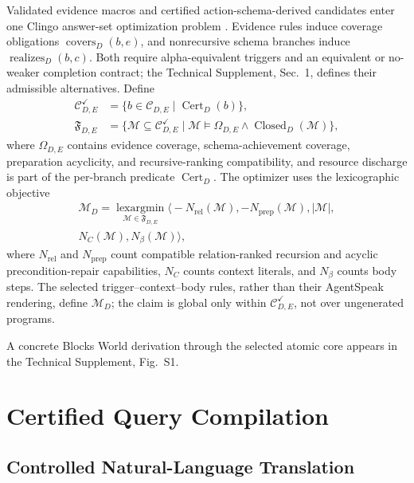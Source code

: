Validated evidence macros and certified action-schema-derived candidates enter
one Clingo answer-set optimization problem
\cite{Gebser2018Clingo}. Evidence rules induce coverage obligations
$\operatorname{covers}_D(b,e)$, and nonrecursive schema branches induce
$\operatorname{realizes}_D(b,c)$. Both require alpha-equivalent triggers and an
equivalent or no-weaker completion contract; the Technical Supplement, Sec.~1,
defines their admissible alternatives.
Define
\begin{align*}
\mathcal C^{\checkmark}_{D,E}
  &=\{b\in\mathcal C_{D,E}\mid\operatorname{Cert}_D(b)\},\\
\mathfrak F_{D,E}
  &=\{\mathcal M\subseteq\mathcal C^{\checkmark}_{D,E}\mid
      \mathcal M\models\Omega_{D,E}\land
      \operatorname{Closed}_D(\mathcal M)\},
\end{align*}
where $\Omega_{D,E}$ contains evidence coverage, schema-achievement coverage,
preparation acyclicity, and recursive-ranking compatibility, and resource
discharge is part of the per-branch predicate $\operatorname{Cert}_D$.
The optimizer uses the
lexicographic objective
\begin{multline*}
\mathcal M_D=\operatorname*{lexargmin}_{\mathcal M\in\mathfrak F_{D,E}}
\bigl\langle-N_{\mathrm{rel}}(\mathcal M),-N_{\mathrm{prep}}(\mathcal M),
|\mathcal M|,\\
N_C(\mathcal M),N_\beta(\mathcal M)\bigr\rangle,
\end{multline*}
where $N_{\mathrm{rel}}$ and $N_{\mathrm{prep}}$ count compatible
relation-ranked recursion and acyclic precondition-repair capabilities,
$N_C$ counts context literals, and $N_\beta$ counts body steps. The selected
trigger--context--body rules, rather than their AgentSpeak rendering, define
$\mathcal M_D$; the claim is global only within
$\mathcal C^{\checkmark}_{D,E}$, not over ungenerated programs.

A concrete Blocks World derivation through the selected atomic core appears in
the Technical Supplement, Fig.~S1.

\section{Certified Query Compilation}
\label{sec:temporal-composition}

\subsection{Controlled Natural-Language Translation}

